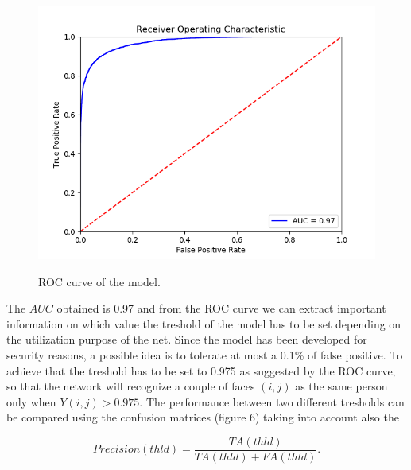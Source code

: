 \begin{figure}[t]
\begin{center}
\includegraphics[width=0.8\linewidth]{images/FINAL_ROC.png}
   \caption{ROC curve of the model.}
\label{fig:long}
\label{fig:onecol}
\end{center}
\end{figure}

The $AUC$ obtained is 0.97 and from the ROC curve we can extract important information on which value the treshold of the model has to be set depending on the utilization purpose of the net.
Since the model has been developed for security reasons, a possible idea is to tolerate at most a 0.1\% of false positive. To achieve that the treshold has to be set to 0.975 as suggested by the ROC curve, so that the network will recognize a couple of faces $(i,j)$ as the same person only when $Y(i,j)>0.975$. The performance between two different tresholds can be compared using the confusion matrices (figure 6) taking into account also the

\begin{equation}
Precision(thld) = \frac{TA(thld)}{TA(thld)+FA(thld)}. 
\end{equation}
 
 

